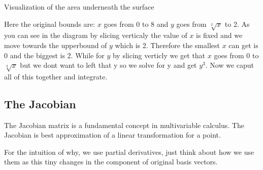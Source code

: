 \begin{center}

    Visualization of the area underneath the surface
    \smallskip

\end{center}

Here the original bounds are: \(x\) goes from 0 to 8 and \(y\) goes from \(\sqrt[3]{x}\) to 2.
As you can see in the diagram by slicing verticaly the value of \(x\) is fixed and we move towards the upperbound of \(y\) which is 2.
Therefore the smallest \(x\) can get is 0 and the biggest is 2. While for \(y\) by slicing verticly we get that \(x\) goes from 0
to \(\sqrt[3]{x}\) but we dont want to left that y so we solve for y and get \(y^3\). Now we caput all of this together and integrate.


\subsection{The Jacobian}

The Jacobian matrix is a fundamental concept in multivariable calculus. The Jacobian is best
approximation of a linear transformation for a point.

For the intuition of why, we use partial derivatives, just think about
how we use them as this tiny changes in the component of original
basis vectors.

